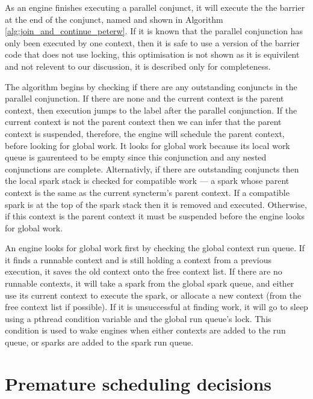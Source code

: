 As an engine finishes executing a parallel conjunct,
it will execute the the barrier at the end of the conjunct,
named \joinandcontinue and shown in 
Algorithm \ref{alg:join_and_continue_peterw}.
If it is known that the parallel conjunction has only been executed by
one context,
then it is safe to use a version of the barrier code that does not use
locking,
this optimisation is not shown as it is equivilent and not relevent to
our discussion,
it is described only for completeness.

The algorithm begins by checking if there are any outstanding conjuncts in
the parallel conjunction.
If there are none and the current context is the parent
context,
then execution jumps to the label after the parallel conjunction.
If the current context is not the parent context then
we can infer that the parent context is suspended,
therefore, 
the engine will schedule the parent context, before looking for global work.
It looks for global work because its local work queue is gaurenteed to be
empty since this conjunction and any nested conjunctions are complete.
Alternativly, if there are outstanding conjuncts then
the local spark stack is checked for compatible work ---
a spark whose parent context is the same as the current syncterm's parent
context.
If a compatible spark is at the top of the spark stack then it is removed
and executed.
Otherwise,
if this context is the parent context it must be suspended
before the engine looks for global work.

An engine looks for global work first by checking the global context run queue.
If it finds a runnable context and is still holding a context from a
previous execution, it saves the old context onto the free context list.
If there are no runnable contexts,
it will take a spark from the global spark queue,
and either use its current context to execute the spark,
or allocate a new context (from the free context list if possible).
If it is unsuccessful at finding work,
it will go to sleep using a pthread condition variable and the global run
queue's lock.
This condition is used to wake engines when either contexts are added to the
run queue,
or sparks are added to the spark run queue.

\section{Premature scheduling decisions}

